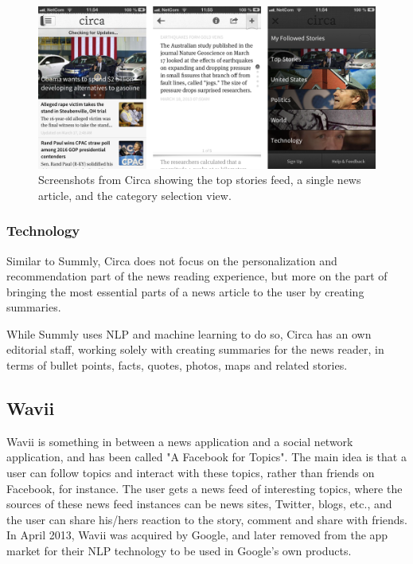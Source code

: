 \begin{figure}[!htbp]
\centering
\includegraphics[width=130mm]{GFX/screenshots/circa.png}
\caption{Screenshots from Circa showing the top stories feed, a single news article, and the category selection view.}
\label{screenshots_circa}
\end{figure}

\subsubsection{Technology}
Similar to Summly, Circa does not focus on the personalization and recommendation part of the news reading experience, but more on the part of bringing the most essential parts of a news article to the user by creating summaries.

While Summly uses NLP and machine learning to do so, Circa has an own editorial staff, working solely with creating summaries for the news reader, in terms of bullet points, facts, quotes, photos, maps and related stories\cite{circa_about}.

\subsection{Wavii}
Wavii is something in between a news application and a social network application, and has been called "A Facebook for Topics"\cite{wavii_facebook_for_topics}. The main idea is that a user can follow topics and interact with these topics, rather than friends on Facebook, for instance. The user gets a news feed of interesting topics, where the sources of these news feed instances can be news sites, Twitter, blogs, etc., and the user can share his/hers reaction to the story, comment and share with friends. In April 2013, Wavii was acquired by Google, and later removed from the app market for their NLP technology to be used in Google's own products\cite{google_acquired_wavii}.

